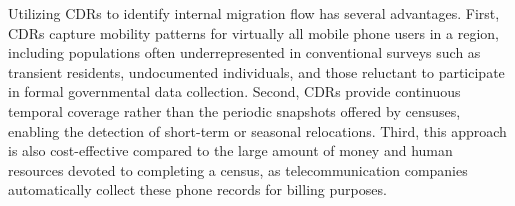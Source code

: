 Utilizing CDRs to identify internal migration flow has several advantages. First, CDRs capture mobility patterns for virtually all mobile phone users in a region, including populations often underrepresented in conventional surveys such as transient residents, undocumented individuals, and those reluctant to participate in formal governmental data collection. Second, CDRs provide continuous temporal coverage rather than the periodic snapshots offered by censuses, enabling the detection of short-term or seasonal relocations. Third, this approach is also cost-effective compared to the large amount of money and human resources devoted to completing a census, as telecommunication companies automatically collect these phone records for billing purposes.




